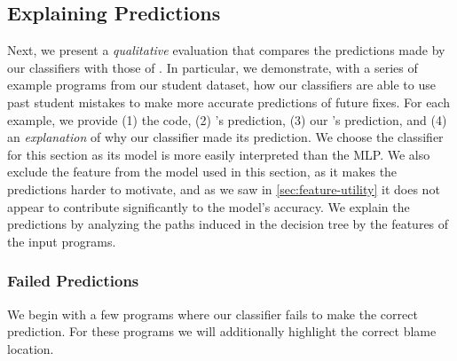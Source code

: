 \subsection{Explaining Predictions}
\label{sec:qualitative}


Next, we present a \emph{qualitative} evaluation that compares the
predictions made by our classifiers with those of \sherrloc.
%
In particular, we demonstrate, with a series of example programs from
our student dataset, how our classifiers are able to use past student
mistakes to make more accurate predictions of future fixes.
%
For each example, we provide
%
(1) the code,
%
(2) \colorbox{sherrloc!75}{\sherrloc's} prediction,
%
(3) our \colorbox{tree!75}{\dectree's} prediction, and
%
(4) an \emph{explanation} of why our classifier made its prediction.
%
We choose the \dectree classifier for this section as its model is more
easily interpreted than the MLP.\@
%
We also exclude the \ExprSize feature from the model used in this
section, as it makes the predictions harder to motivate, and as we saw
in \autoref{sec:feature-utility} it does not appear to contribute
significantly to the model's accuracy.
%
We explain the predictions by analyzing the paths induced in
the decision tree by the features of the input programs.
%

\subsubsection{Failed Predictions}
\label{sec:failed-predictions}
We begin with a few programs where our classifier fails to
make the correct prediction.
%
For these programs we will additionally \colorbox{fix!75}{highlight} the
correct blame location.

